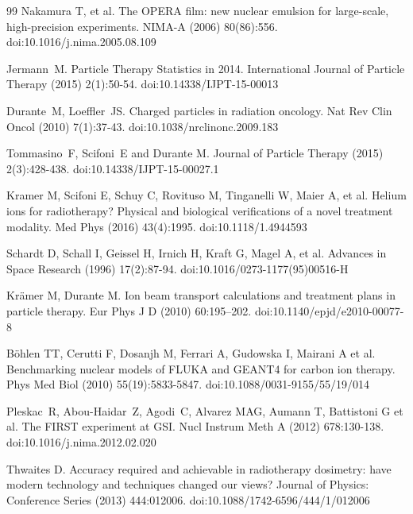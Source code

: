 \documentclass[utf8]{frontiersFPHY} %
\begin{document}
\begin{thebibliography}{99}
 Nakamura T, et al. The OPERA film: new nuclear emulsion for large-scale, high-precision experiments. NIMA-A (2006) 80(86):556. doi:10.1016/j.nima.2005.08.109
	


 Jermann~M. Particle Therapy Statistics in 2014. International Journal of Particle Therapy (2015) 2(1):50-54. doi:10.14338/IJPT-15-00013

 Durante~M, Loeffler~JS. Charged particles in radiation oncology. Nat Rev Clin Oncol (2010) 7(1):37‐43. doi:10.1038/nrclinonc.2009.183

 Tommasino~F, Scifoni~E and Durante M. Journal of Particle Therapy (2015) 2(3):428-438. doi:10.14338/IJPT-15-00027.1

 Kramer M, Scifoni E, Schuy C, Rovituso M, Tinganelli W, Maier A, et al. Helium ions for radiotherapy? Physical and biological verifications of a novel treatment modality. Med Phys (2016) 43(4):1995. doi:10.1118/1.4944593

 Schardt D, Schall I, Geissel H, Irnich H, Kraft G, Magel A, et al. Advances in Space Research (1996) 17(2):87-94. doi:10.1016/0273-1177(95)00516-H

 Krämer M, Durante M. Ion beam transport calculations and treatment plans in particle therapy. Eur Phys J D (2010) 60:195–202. doi:10.1140/epjd/e2010-00077-8

 B\"ohlen TT, Cerutti F, Dosanjh M, Ferrari A, Gudowska I, Mairani A et al. Benchmarking nuclear models of FLUKA and GEANT4 for carbon ion therapy. Phys Med Biol (2010) 55(19):5833-5847. doi:10.1088/0031-9155/55/19/014

 Pleskac~R, Abou-Haidar~Z, Agodi~C, Alvarez MAG, Aumann T, Battistoni G et al. The FIRST experiment at GSI. Nucl Instrum Meth A (2012) 678:130-138. doi:10.1016/j.nima.2012.02.020 

 Thwaites D. Accuracy required and achievable in radiotherapy dosimetry:
have modern technology and techniques changed our views? Journal of Physics: Conference Series (2013) 444:012006. doi:10.1088/1742-6596/444/1/012006


\end{thebibliography}
\end{document}
